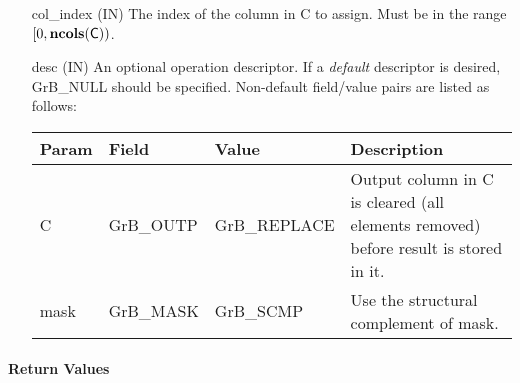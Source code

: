 \begin{itemize}[leftmargin=1.1in]
    \item[{\sf col\_index}]  ({\sf IN}) The index of the column in {\sf C} to 
    assign. Must be in the range $[0, \bold{ncols}({\sf C}))$.

    \item[{\sf desc}] ({\sf IN}) An optional operation descriptor. If
    a \emph{default} descriptor is desired, {\sf GrB\_NULL} should be
    specified. Non-default field/value pairs are listed as follows:  \\

    \begin{tabular}{lllp{2.5in}}
        Param & Field  & Value & Description \\
        \hline
        {\sf C}    & {\sf GrB\_OUTP} & {\sf GrB\_REPLACE} &  Output column in 
        {\sf C} is cleared (all elements removed) before result is stored in it.\\
    
        {\sf mask} & {\sf GrB\_MASK} & {\sf GrB\_SCMP}   & Use the structural 
        complement of {\sf mask}. \\
    \end{tabular}

\end{itemize}

\paragraph{Return Values}

